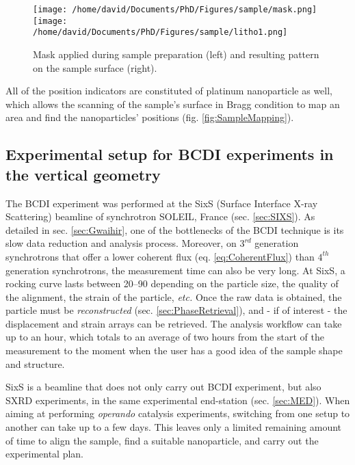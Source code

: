 \begin{figure}[!htb]
    \centering
    \texttt{[image: /home/david/Documents/PhD/Figures/sample/mask.png]}
    \texttt{[image: /home/david/Documents/PhD/Figures/sample/litho1.png]}
    \caption{
        Mask applied during sample preparation (left) and resulting pattern on the sample surface (right).
    }
    \label{fig:Mask}
\end{figure}

All of the position indicators are constituted of platinum nanoparticle as well, which allows the scanning of the sample's surface in Bragg condition to map an area and find the nanoparticles' positions (fig. \ref{fig:SampleMapping}).

\subsection{Experimental setup for BCDI experiments in the vertical geometry}\label{sec:BCDISetup}

The BCDI experiment was performed at the SixS (Surface Interface X-ray Scattering) beamline of synchrotron SOLEIL, France (sec. \ref{sec:SIXS}).
As detailed in sec. \ref{sec:Gwaihir}, one of the bottlenecks of the BCDI technique is its slow data reduction and analysis process.
Moreover, on $3^{rd}$ generation synchrotrons that offer a lower coherent flux (eq. \ref{eq:CoherentFlux}) than $4^{th}$ generation synchrotrons, the measurement time can also be very long.
At SixS, a rocking curve lasts between \qtyrange{20}{90}{\min} depending on the particle size, the quality of the alignment, the strain of the particle, \textit{etc.}
Once the raw data is obtained, the particle must be \textit{reconstructed} (sec. \ref{sec:PhaseRetrieval}), and - if of interest - the displacement and strain arrays can be retrieved.
The analysis workflow can take up to an hour, which totals to an average of two hours from the start of the measurement to the moment when the user has a good idea of the sample shape and structure.

SixS is a beamline that does not only carry out BCDI experiment, but also SXRD experiments, in the same experimental end-station (sec. \ref{sec:MED}).
When aiming at performing \textit{operando} catalysis experiments, switching from one setup to another can take up to a few days.
This leaves only a limited remaining amount of time to align the sample, find a suitable nanoparticle, and carry out the experimental plan.

